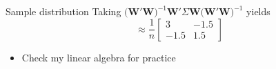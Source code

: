 \documentclass[aspectratio=169,t,11pt,table]{beamer}
\begin{document}
% 

\begin{frame}{Sample distribution}
  Taking $\big( \bm{W}' \bm{W} \big)^{-1} \bm{W}' \Sigma \bm{W} \big( \bm{W}' \bm{W} \big)^{-1}$ yields
  $$
    \approx \frac{1}{n} 
    \begin{bmatrix}
      3 & -1.5 \\
      -1.5 & 1.5
    \end{bmatrix}
  $$

  \begin{itemize}
    \item Check my linear algebra for practice
  \end{itemize}
\end{frame}
\end{document}
